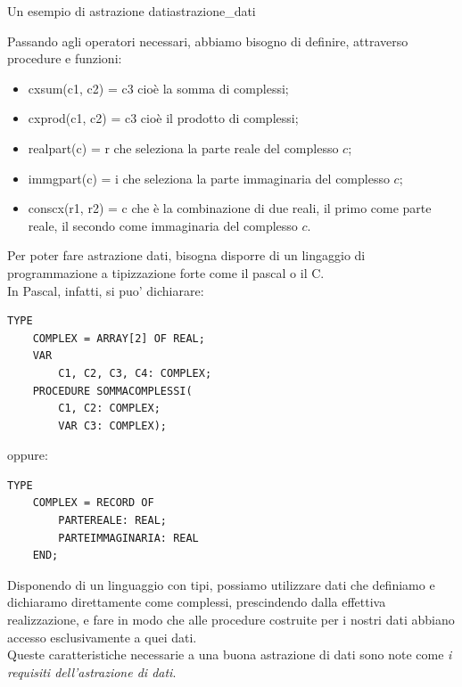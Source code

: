 \documentclass[12pt]{report}
\newcommand{\nmu}{}
\begin{document}
\begin{example}{\nmu Un esempio di astrazione dati}{astrazione_dati}
\begin{itemize}
\begin{itemize}
			\end{itemize}
		\end{itemize}
		Passando agli operatori necessari, abbiamo bisogno di definire, attraverso procedure e funzioni:
		\begin{itemize}
			\item cxsum(c1, c2) = c3 cioè la somma di complessi;
			\item cxprod(c1, c2) = c3 cioè il prodotto di complessi;
			\item realpart(c) = r che seleziona la parte reale del complesso $c$;
			\item immgpart(c) = i che seleziona la parte immaginaria del complesso $c$;
			\item conscx(r1, r2) = c che è la combinazione di due reali, il primo come parte reale, il secondo come immaginaria del complesso $c$.
		\end{itemize}
		Per poter fare astrazione dati, bisogna disporre di un lingaggio di programmazione a tipizzazione forte come il pascal o il C. \\
		In Pascal, infatti, si puo' dichiarare:
		\begin{lstlisting}[style=pascalstyle]
TYPE
	COMPLEX = ARRAY[2] OF REAL;
	VAR
		C1, C2, C3, C4: COMPLEX;
	PROCEDURE SOMMACOMPLESSI(
		C1, C2: COMPLEX;
		VAR C3: COMPLEX);
\end{lstlisting}
		oppure:
		\begin{lstlisting}[style=pascalstyle]
TYPE
	COMPLEX = RECORD OF
		PARTEREALE: REAL;
		PARTEIMMAGINARIA: REAL
	END;
\end{lstlisting}
	\end{example}
	Disponendo di un linguaggio con tipi, possiamo utilizzare dati che definiamo e dichiaramo direttamente come complessi, prescindendo dalla effettiva realizzazione, e fare in modo che alle procedure costruite per i nostri dati abbiano accesso esclusivamente a quei dati. \\
	Queste caratteristiche necessarie a una buona astrazione di dati sono note come \textit{i requisiti dell'astrazione di dati}.
\end{document}
